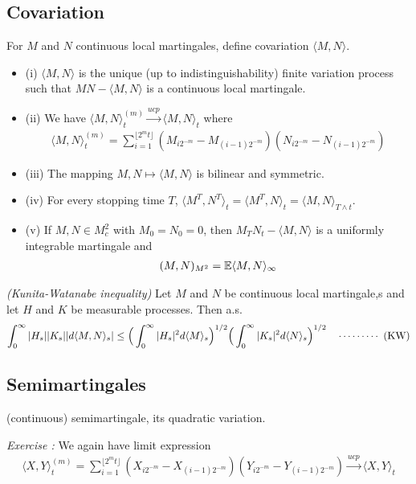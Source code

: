 \documentclass[10pt,a4paper]{article}
\renewenvironment{i}
{\begin{itemize} 
	}%
	{\end{itemize}
}
\begin{document}
\subsection{Covariation}

 For $M$ and $N$ continuous local martingales, define covariation $\langle M, N\rangle$.
\s

\prop 
\begin{i}
\item[(i)] $\langle M, N\rangle$ is the unique (up to indistinguishability) finite variation process such that $MN -\langle M, N\rangle$ is a continuous local martingale.
\item[(ii)] We have $\langle M, N \rangle_t^{(m)} \xrightarrow{ucp} \langle M, N \rangle_{t}$ where
\begin{align*}
\langle M, N \rangle_t^{(m)} = \sum_{i=1}^{\lfloor 2^m t \rfloor} (M_{i2^{-m}}-M_{(i-1)2^{-m}})(N_{i2^{-m}}-N_{(i-1)2^{-m}})
\end{align*}
\item[(iii)] The mapping $M,N \mapsto \langle M, N \rangle$ is bilinear and symmetric.
\item[(iv)] For every stopping time $T$, $\langle M^T, N^T \rangle_t = \langle M^T, N \rangle_t = \langle M, N \rangle_{T\wedge t}$.
\item[(v)] If $M, N \in M_c^2$ with $M_0 =N_0 =0$, then $M_T N_t - \langle M, N \rangle$ is a uniformly integrable martingale and
\begin{align*}
(M, N)_{M^2} = \mathbb{E} \langle M, N \rangle_{\infty}
\end{align*}
\end{i}
\s

\prop \emph{(Kunita-Watanabe inequality)} Let $M$ and $N$ be continuous local martingale,s and let $H$ and $K$ be measurable processes. Then a.s.
\begin{align*}
\int_0^{\infty} |H_s| |K_s| |d\langle M, N\rangle_s| \leq \Big( \int_{0}^{\infty} |H_s|^2 d\langle M \rangle_s \Big)^{1/2} \Big( \int_{0}^{\infty} |K_s|^2 d\langle N \rangle_s \Big)^{1/2} \quad \cdots\cdots\cdots\,\,(\text{KW})
\end{align*}

\subsection{Semimartingales}

 (continuous) semimartingale, its quadratic variation.
\s

\emph{Exercise :} We again have limit expression
\begin{align*}
\langle X, Y \rangle_{t}^{(m)} = \sum_{i=1}^{\lfloor 2^m t\rfloor} (X_{i2^{-m}} -X_{(i-1)2^{-m}})(Y_{i2^{-m}} -Y_{(i-1)2^{-m}}) \xrightarrow{ucp} \langle X, Y \rangle_t
\end{align*}
\end{document}
